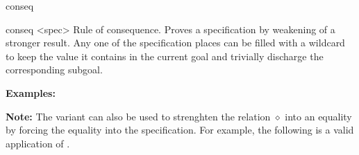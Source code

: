 \begin{tactic}{conseq}
  \begin{tsyntax}{conseq <spec>}
  Rule of consequence. Proves a specification by weakening of a
  stronger result. Any one of the specification places can be filled
  with a wildcard \ec{_} to keep the value it contains in the current
  goal and trivially discharge the corresponding subgoal.

  \textbf{Examples:}

  \textbf{Note:} The \phl variant can also be used to strenghten the
  relation $\diamond$ into an equality by forcing the equality into
  the specification. For example, the following is a valid application
  of .
  \end{tsyntax}


\end{tactic}
